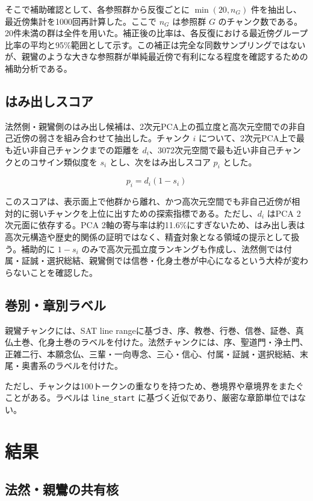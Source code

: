 \documentclass[uplatex,dvipdfmx,11pt,a4paper]{jsarticle}
\begin{document}
そこで補助確認として、各参照群から反復ごとに \(\min(20, n_G)\) 件を抽出し、最近傍集計を1000回再計算した。ここで \(n_G\) は参照群 \(G\) のチャンク数である。20件未満の群は全件を用いた。補正後の比率は、各反復における最近傍グループ比率の平均と95\%範囲として示す。この補正は完全な同数サンプリングではないが、親鸞のような大きな参照群が単純最近傍で有利になる程度を確認するための補助分析である。

\subsection{はみ出しスコア}

法然側・親鸞側のはみ出し候補は、2次元PCA上の孤立度と高次元空間での非自己近傍の弱さを組み合わせて抽出した。チャンク \(i\) について、2次元PCA上で最も近い非自己チャンクまでの距離を \(d_i\)、3072次元空間で最も近い非自己チャンクとのコサイン類似度を \(s_i\) とし、次をはみ出しスコア \(p_i\) とした。

\[
  p_i = d_i (1 - s_i)
\]

このスコアは、表示面上で他群から離れ、かつ高次元空間でも非自己近傍が相対的に弱いチャンクを上位に出すための探索指標である。ただし、\(d_i\) はPCA 2次元面に依存する。PCA 2軸の寄与率は約11.6\%にすぎないため、はみ出し表は高次元構造や歴史的関係の証明ではなく、精査対象となる領域の提示として扱う。補助的に \(1-s_i\) のみで高次元孤立度ランキングも作成し、法然側では付属・証誠・選択総結、親鸞側では信巻・化身土巻が中心になるという大枠が変わらないことを確認した。

\subsection{巻別・章別ラベル}

親鸞チャンクには、SAT line rangeに基づき、序、教巻、行巻、信巻、証巻、真仏土巻、化身土巻のラベルを付けた。法然チャンクには、序、聖道門・浄土門、正雑二行、本願念仏、三輩・一向専念、三心・信心、付属・証誠・選択総結、末尾・奥書系のラベルを付けた。

ただし、チャンクは100トークンの重なりを持つため、巻境界や章境界をまたぐことがある。ラベルは \texttt{line\_start} に基づく近似であり、厳密な章節単位ではない。

\section{結果}

\subsection{法然・親鸞の共有核}
\end{document}
